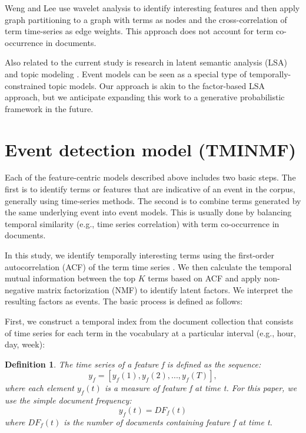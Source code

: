 \documentclass{sig-alternate}
\newtheorem{definition}{Definition}
\begin{document}
Weng and Lee \cite{Weng2011} use wavelet analysis to identify interesting features and then apply graph partitioning to a graph with terms as nodes and the cross-correlation of term time-series as edge weights. This approach does not account for term co-occurrence in documents.

Also related to the current study is research in latent semantic analysis (LSA) \cite{Deerwester1990, Hofmann1999} and topic modeling \cite{Blei2003}.  Event models can be seen as a special type of temporally-constrained topic models. Our approach is akin to the factor-based LSA approach, but we anticipate expanding this work to a generative probabilistic framework in the future.  




\section{Event detection model (TMINMF)}

Each of the feature-centric models described above includes two basic steps. The first is to identify terms or features that are indicative of an event in the corpus, generally using time-series methods. The second is to combine terms generated by the same underlying event into event models.  This is usually done by balancing temporal similarity (e.g., time series correlation) with term co-occurrence in documents.

In this study, we identify temporally interesting terms using the first-order autocorrelation (ACF) of the term time series \cite{Jones2007}. We then calculate the temporal mutual information between the top $K$ terms based on ACF and apply non-negative matrix factorization (NMF) to identify latent factors. We interpret the resulting factors as events. The basic process is defined as follows:

First, we construct a temporal index from the document collection that consists of time series for each term in the vocabulary at a particular interval (e.g., hour, day, week):
\begin{definition}
 The time series of a feature f is defined as the sequence:
\[
y_f = [y_f(1), y_f(2), ..., y_f(T)],
\]
where each element $y_f(t)$ is a measure of feature f at time t. For this paper, we use the simple document frequency:
\[
	y_f(t) = DF_f(t)
\]
where $DF_f(t)$ is the number of documents containing feature f at time t.
\end{definition}
\end{document}
